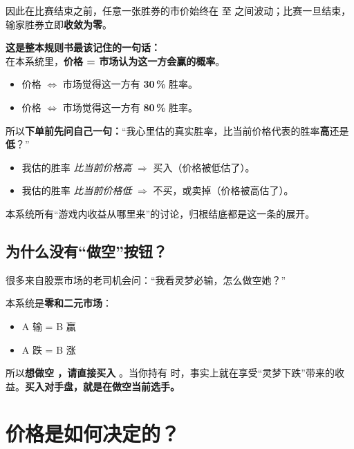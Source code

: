 \documentclass[11pt,a4paper,twoside]{article}
\begin{document}
\vspace{0.6em}

因此在比赛结束之前，任意一张胜券的市价始终在  至  之间波动；比赛一旦结束，输家胜券立即\textbf{收敛为零}。

\begin{notebox}
\textbf{这是整本规则书最该记住的一句话：}\\
在本系统里，\textbf{价格 \;=\; 市场认为这一方会赢的概率}。
\begin{itemize}
  \item 价格  \;$\Longleftrightarrow$\; 市场觉得这一方有 \textbf{30\,\%} 胜率。
  \item 价格  \;$\Longleftrightarrow$\; 市场觉得这一方有 \textbf{80\,\%} 胜率。
\end{itemize}
所以\textbf{下单前先问自己一句：}\;“我心里估的真实胜率，比当前价格代表的胜率\textbf{高}还是\textbf{低}？”
\begin{itemize}
  \item 我估的胜率 \textit{比当前价格高} \;$\Rightarrow$\; 买入（价格被低估了）。
  \item 我估的胜率 \textit{比当前价格低} \;$\Rightarrow$\; 不买，或卖掉（价格被高估了）。
\end{itemize}
本系统所有“游戏内收益从哪里来”的讨论，归根结底都是这一条的展开。
\end{notebox}

\subsection*{为什么没有“做空”按钮？}

很多来自股票市场的老司机会问：“我看灵梦必输，怎么做空她？”

\begin{tipbox}
本系统是\textbf{零和二元市场}：
\begin{itemize}
  \item A 输 \;=\; B 赢
  \item A 跌 \;=\; B 涨
\end{itemize}
所以\textbf{想做空 \Reimu，请直接买入 \Marisa}。当你持有 \Bcard 时，事实上就在享受“灵梦下跌”带来的收益。\textbf{买入对手盘，就是在做空当前选手。}
\end{tipbox}

\section{价格是如何决定的？}
\end{document}
